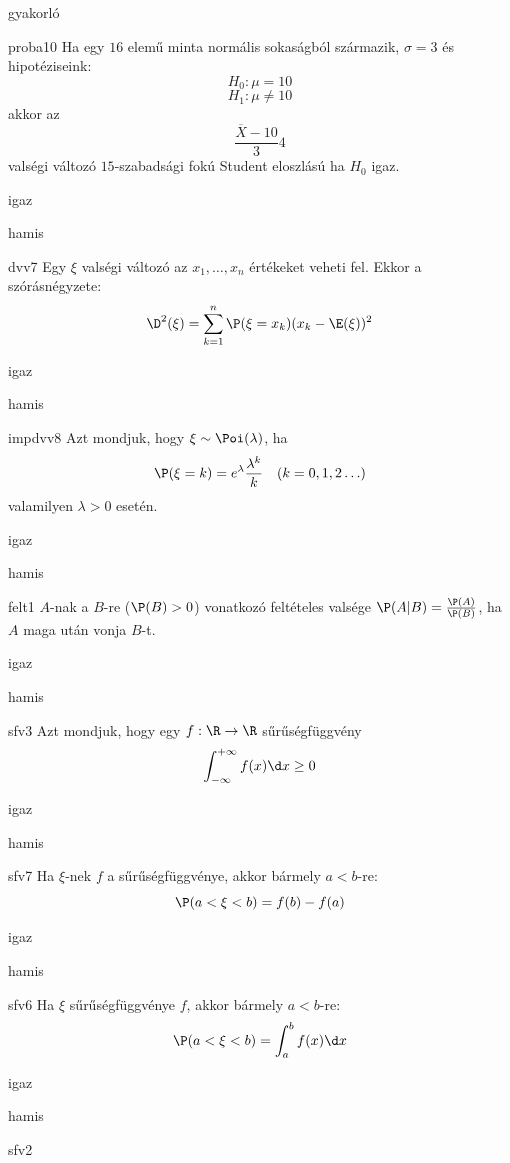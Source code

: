 \documentclass[12pt]{article}
\begin{document}
\begin{quiz}{gyakorló}
\begin{multi}[feedback={A feltételek mellett a fenti mennyiség sztenderd normális, ha $H_0$ igaz.}]{proba10}
Ha egy $16$ elemű minta normális sokaságból származik, $\sigma=3$ és hipotéziseink:
$$
H_0: \mu=10
$$
$$
H_1: \mu\neq 10
$$
akkor az 
$$
\frac{\overline{X}-10}{3}4
$$
valségi változó $15$-szabadsági fokú Student eloszlású ha $H_0$ igaz.
\item igaz
\item* hamis
\end{multi}
\begin{multi}[feedback={Def.}]{dvv7}
Egy $\xi$ valségi változó az $x_1,\ldots, x_n$ értékeket veheti fel. Ekkor a szórásnégyzete:
$$
\D^2(\xi)=\sum_{k=1}^n \P(\xi=x_k)(x_k-\E(\xi))^2
$$
\item* igaz
\item hamis
\end{multi}
\begin{multi}[feedback={Def.}]{impdvv8}
Azt mondjuk, hogy $\xi\sim \Poi(\lambda)$, ha 
$$
\P(\xi=k)=e^{\lambda}\frac{\lambda^k}{k}\ \ \ (k=0,1,2\ldots )
$$ 
valamilyen $\lambda>0$ esetén.
\item igaz
\item* hamis
\end{multi}
\begin{multi}[feedback={Def.+$P(AB)=P(A)$ a feltételekből.}]{felt1}
$A$-nak a $B$-re ($\P(B)>0$) vonatkozó feltételes valsége $\P(A|B)=\frac{\P(A)}{\P(B)}$, ha $A$ maga után vonja $B$-t.
\item* igaz
\item hamis
\end{multi}
\begin{multi}[feedback={$f\ge 0$ fontos (monoton nemcsökkenő $F$-nek a deriváltja)}]{sfv3}
Azt mondjuk, hogy egy $f:\R\to \R$ sűrűségfüggvény 
$$
\int_{-\infty}^{+\infty}f(x)\d x\ge 0
$$
\item igaz
\item* hamis
\end{multi}
\begin{multi}[feedback={Def.}]{sfv7}
Ha $\xi$-nek $f$ a sűrűségfüggvénye, akkor bármely $a<b$-re:
$$
\P(a<\xi<b)=f(b)-f(a)
$$
\item igaz
\item* hamis
\end{multi}
\begin{multi}[feedback={Def.}]{sfv6}
Ha $\xi$ sűrűségfüggvénye $f$, akkor bármely $a<b$-re:
$$
\P(a<\xi<b)=\int_{a}^{b}f(x)\d x
$$
\item* igaz
\item hamis
\end{multi}
\begin{multi}[feedback={Def.}]{sfv2}

\end{multi}
\end{quiz}
\end{document}
